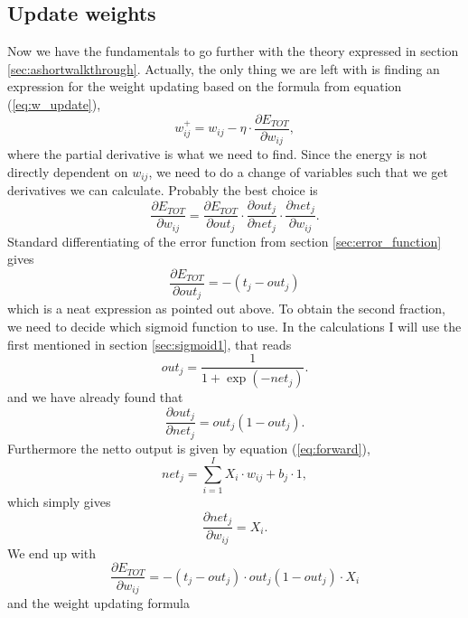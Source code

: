 \documentclass[norsk,a4paper,12pt]{article}
\begin{document}
\subsection{Update weights}
Now we have the fundamentals to go further with the theory expressed in section \ref{sec:ashortwalkthrough}. Actually, the only thing we are left with is finding an expression for the weight updating based on the formula from equation (\ref{eq:w_update}), 
\begin{equation}
w_{ij}^+= w_{ij} - \eta\cdot\frac{\partial E_{TOT}}{\partial w_{ij}},
\end{equation}
where the partial derivative is what we need to find. Since the energy is not directly dependent on $w_{ij}$, we need to do a change of variables such that we get derivatives we can calculate. Probably the best choice is
\begin{equation}
\frac{\partial E_{TOT}}{\partial w_{ij}}=\frac{\partial E_{TOT}}{\partial out_{j}}\cdot\frac{\partial out_{j}}{\partial net_{j}}\cdot\frac{\partial net_{j}}{\partial w_{ij}}.
\end{equation}
Standard differentiating of the error function from section \ref{sec:error_function} gives
\begin{equation}
\frac{\partial E_{TOT}}{\partial out_{j}}=-(t_j-out_j)
\end{equation}
which is a neat expression as pointed out above. To obtain the second fraction, we need to decide which sigmoid function to use. In the calculations I will use the first mentioned in section \ref{sec:sigmoid1}, that reads
\begin{equation}
out_j=\frac{1}{1+\exp(-net_j)}.
\end{equation}
and we have already found that
\begin{equation}
\frac{\partial out_{j}}{\partial net_{j}}=out_j(1-out_j).
\end{equation}
Furthermore the netto output is given by equation (\ref{eq:forward}),
\begin{equation}
net_j = \sum_{i=1}^{I} X_i\cdot w_{ij} + b_j\cdot 1,
\end{equation}
which simply gives
\begin{equation}
\frac{\partial net_{j}}{\partial w_{ij}}=X_i.
\end{equation}
We end up with 
\begin{equation}
\frac{\partial E_{TOT}}{\partial w_{ij}}=-(t_j-out_j)\cdot out_j(1-out_j)\cdot X_i
\end{equation}
and the weight updating formula
\end{document}
